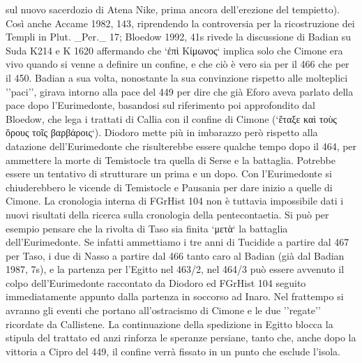 {            %
 sul nuovo sacerdozio di Atena Nike, prima ancora dell'erezione del tempietto). Così anche Accame 1982, 143, riprendendo la controversia per la ricostruzione dei Templi in Plut. _Per._ 17; Bloedow 1992, 41s rivede la discussione di Badian su Suda K214 e K 1620 affermando che `ἐπὶ Kίμωνος`  implica solo che  Cimone era vivo quando si venne a definire un confine, e che ciò è vero sia per il 466 che per il 450. Badian a sua volta, nonostante la sua convinzione rispetto alle molteplici ''paci'', girava intorno alla pace del 449 per dire che già Eforo aveva parlato della pace dopo l'Eurimedonte, basandosi sul riferimento poi approfondito dal Bloedow, che lega i trattati di Callia con il confine di  Cimone (`ἔταξε καὶ τοὺς ὅρους τοῖς βαρβάροις`).  Diodoro mette più in imbarazzo però rispetto alla datazione dell'Eurimedonte che risulterebbe essere qualche tempo dopo il 464, per ammettere la morte di Temistocle tra quella di Serse e la battaglia. Potrebbe essere un tentativo di strutturare un prima e un dopo. Con l'Eurimedonte si chiuderebbero le vicende di Temistocle e Pausania  per dare inizio a quelle di Cimone. La cronologia interna di FGrHist 104 non è tuttavia impossibile dati i nuovi risultati della ricerca sulla cronologia della pentecontaetia. Si può per esempio pensare che la rivolta di Taso sia finita `μετὰ` la battaglia dell'Eurimedonte. Se infatti ammettiamo i tre anni di Tucidide a partire dal 467 per Taso, i due di Nasso a partire dal 466 tanto caro al Badian (già dal Badian 1987, 7s), e la partenza per l'Egitto nel 463/2, nel 464/3 può essere avvenuto il colpo dell'Eurimedonte raccontato da  Diodoro ed FGrHist 104 seguito immediatamente appunto dalla partenza in soccorso ad Inaro. Nel frattempo si avranno gli eventi che portano all'ostracismo di  Cimone e le due ''regate'' ricordate da  Callistene. La continuazione della spedizione in Egitto blocca la stipula del trattato ed anzi rinforza le speranze persiane, tanto che, anche dopo la vittoria a Cipro del 449, il confine verrà fissato in un punto che esclude l'isola. 
}
